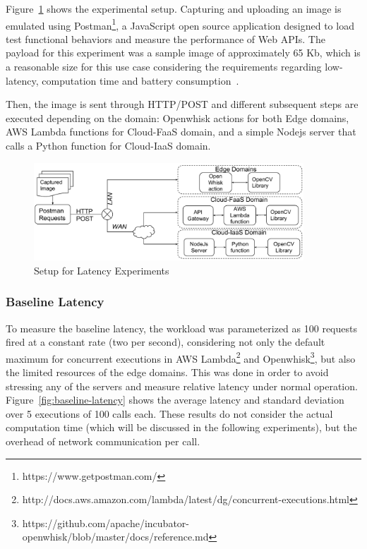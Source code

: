 Figure~\ref{fig:exp-setup1} shows the experimental setup. Capturing and uploading an image is emulated using Postman\footnote{https://www.getpostman.com/}, a JavaScript open source application designed to load test functional behaviors and measure the performance of Web APIs. The  payload for this experiment was a sample image of approximately 65 Kb, which is a reasonable size for this use case considering the requirements regarding low-latency, computation time and battery consumption~\cite{rodriguez16mobile}. 

Then, the image is sent through HTTP/POST and different subsequent steps are executed depending on the domain: Openwhisk actions for both Edge domains, AWS Lambda functions for Cloud-FaaS domain, and a simple Nodejs server that calls a Python function for Cloud-IaaS domain.



\begin{figure}
	
	\centering
	\includegraphics[width=0.9\textwidth]{figs/experimental-setup.pdf}
	\caption{Setup for Latency Experiments}
	\label{fig:exp-setup1}
\end{figure}

\subsubsection{Baseline Latency}

To measure the baseline latency, the workload was parameterized as 100 requests fired at a constant rate (two per second), considering not only the default maximum for concurrent executions in AWS Lambda\footnote{http://docs.aws.amazon.com/lambda/latest/dg/concurrent-executions.html} and Openwhisk\footnote{https://github.com/apache/incubator-openwhisk/blob/master/docs/reference.md}, but also the limited resources of the edge domains. This was done in order to avoid stressing any of the servers and measure relative latency under normal operation. Figure~\ref{fig:baseline-latency} shows the average latency and standard deviation over 5 executions of 100 calls each. These results do not consider the actual computation time (which will be discussed in the following experiments), but the overhead of network communication per call. 

